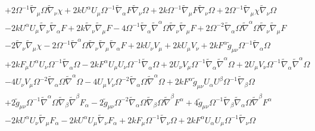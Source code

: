 \documentclass[10pt,letterpaper]{article}
\numberwithin{equation}{section}
\begin{document}
\begin{eqnarray}
&& + 2 \Omega^{-1} \tilde{\nabla}_{\mu }\Omega \tilde{\nabla}_{\nu }\chi + 2 k U^{\alpha } U_{\mu } \Omega^{-1} \tilde{\nabla}_{\alpha }F \tilde{\nabla}_{\nu }\Omega + 2 k \Omega^{-1} \tilde{\nabla}_{\mu }F \tilde{\nabla}_{\nu }\Omega + 2 \Omega^{-1} \tilde{\nabla}_{\mu }\chi \tilde{\nabla}_{\nu }\Omega \nonumber \\ 
&& - 2 k U^{\alpha } U_{\mu } \tilde{\nabla}_{\nu }\tilde{\nabla}_{\alpha }F + 2 k \tilde{\nabla}_{\nu }\tilde{\nabla}_{\mu }F - 4 \Omega^{-1} \tilde{\nabla}_{\alpha }\tilde{\nabla}^{\alpha }\Omega \tilde{\nabla}_{\nu }\tilde{\nabla}_{\mu }F + 2 \Omega^{-2} \tilde{\nabla}_{\alpha }\Omega \tilde{\nabla}^{\alpha }\Omega \tilde{\nabla}_{\nu }\tilde{\nabla}_{\mu }F \nonumber \\ 
&& - 2 \tilde{\nabla}_{\nu }\tilde{\nabla}_{\mu }\chi - 2 \Omega^{-1} \tilde{\nabla}^{\alpha }\Omega \tilde{\nabla}_{\nu }\tilde{\nabla}_{\mu }\tilde{\nabla}_{\alpha }F+2 k U_{\nu } V_{\mu } + 2 k U_{\mu } V_{\nu } + 2 k F^{\alpha } \tilde{g}_{\mu \nu } \Omega^{-1} \tilde{\nabla}_{\alpha }\Omega \nonumber \\ 
&& + 2 k F_{\mu } U^{\alpha } U_{\nu } \Omega^{-1} \tilde{\nabla}_{\alpha }\Omega - 2 k F^{\alpha } U_{\mu } U_{\nu } \Omega^{-1} \tilde{\nabla}_{\alpha }\Omega + 2 U_{\nu } V_{\mu } \Omega^{-1} \tilde{\nabla}_{\alpha }\tilde{\nabla}^{\alpha }\Omega + 2 U_{\mu } V_{\nu } \Omega^{-1} \tilde{\nabla}_{\alpha }\tilde{\nabla}^{\alpha }\Omega \nonumber \\ 
&& - 4 U_{\nu } V_{\mu } \Omega^{-2} \tilde{\nabla}_{\alpha }\Omega \tilde{\nabla}^{\alpha }\Omega - 4 U_{\mu } V_{\nu } \Omega^{-2} \tilde{\nabla}_{\alpha }\Omega \tilde{\nabla}^{\alpha }\Omega + 2 k F^{\alpha } \tilde{g}_{\mu \nu } U_{\alpha } U^{\beta } \Omega^{-1} \tilde{\nabla}_{\beta }\Omega \nonumber \\ 
&& + 2 \tilde{g}_{\mu \nu } \Omega^{-1} \tilde{\nabla}^{\alpha }\Omega \tilde{\nabla}_{\beta }\tilde{\nabla}^{\beta }F_{\alpha } - 2 \tilde{g}_{\mu \nu } \Omega^{-2} \tilde{\nabla}_{\alpha }\Omega \tilde{\nabla}_{\beta }\Omega \tilde{\nabla}^{\beta }F^{\alpha } + 4 \tilde{g}_{\mu \nu } \Omega^{-1} \tilde{\nabla}_{\beta }\tilde{\nabla}_{\alpha }\Omega \tilde{\nabla}^{\beta }F^{\alpha } \nonumber \\ 
&& - 2 k U^{\alpha } U_{\nu } \tilde{\nabla}_{\mu }F_{\alpha } - 2 k U^{\alpha } U_{\mu } \tilde{\nabla}_{\nu }F_{\alpha } + 2 k F_{\mu } \Omega^{-1} \tilde{\nabla}_{\nu }\Omega + 2 k F^{\alpha } U_{\alpha } U_{\mu } \Omega^{-1} \tilde{\nabla}_{\nu }\Omega \nonumber \\ 

\end{eqnarray}
\end{document}
